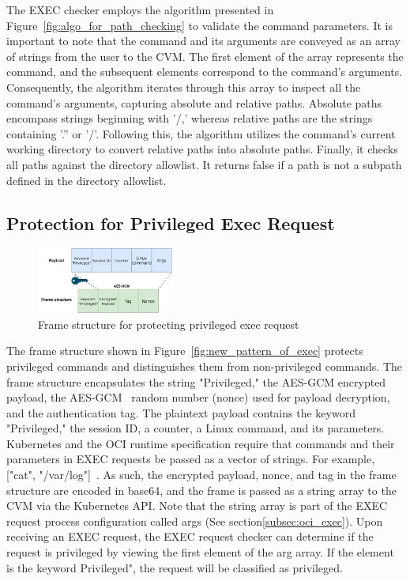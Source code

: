 The EXEC checker employs the algorithm presented in Figure~\ref{fig:algo_for_path_checking} to validate the command parameters. It is important to note that the command and its arguments are conveyed as an array of strings from the user to the \acrshort{CVM}. The first element of the array represents the command, and the subsequent elements 
correspond to the command's arguments. Consequently, the algorithm iterates through this array to inspect all the command's arguments, capturing absolute and relative paths. Absolute paths encompass strings beginning with '/,' whereas relative paths are the strings containing '.'' or '/'. Following 
this, the algorithm utilizes the command's current working directory to convert relative paths into absolute paths. Finally, it checks all paths against the directory allowlist. It returns false if a path is not a subpath defined in the directory allowlist.


\subsection{Protection for Privileged Exec Request}
\label{sec:design_prptect_privileged_request}
\begin{figure}[!htb]
    \centering
    \includegraphics[width=0.4\textwidth]{images/exec_frame.png}
    \caption[Frame structure  for protecting privileged exec request]{Frame structure  for protecting privileged exec request}
    \label{fig:exec_frame}
\end{figure}
The frame structure shown in Figure~\ref{fig:new_pattern_of_exec} protects privileged commands and distinguishes them from non-privileged commands. The frame structure encapsulates the string "Privileged," the AES-GCM encrypted payload, the AES-GCM~\cite*{aes_gcm} random number (nonce) used for payload decryption, and the authentication tag. 
The plaintext payload contains the keyword "Privileged," the session ID, a counter,  a Linux command, and its parameters. Kubernetes and the OCI runtime specification require that commands and their parameters in EXEC requests be passed as a vector of strings. For example, ["cat", "/var/log"]~\cite*{k8s}. As such, 
the encrypted payload, nonce, and tag in the frame structure are encoded in base64, and the frame is passed as a string array to the \acrshort{CVM} via the Kubernetes API. Note that the string array is part of the EXEC request process configuration called args (See section\ref{subsec:oci_exec}). Upon receiving an EXEC request, 
the EXEC request checker can determine if the request is privileged by viewing the first element of the arg array. If the element is the keyword Privileged", the request will be classified as privileged.

